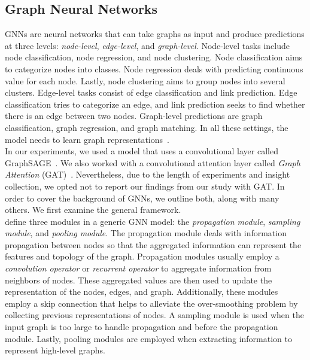 \subsection{Graph Neural Networks}
\label{subsec:mixedApproaches_GraphNeuralNetworks}
GNNs are neural networks that can take graphs as input and produce predictions at three levels:
\emph{node-level}, \emph{edge-level}, and \emph{graph-level}. Node-level tasks include node classification, node
regression, and node clustering. Node classification aims to categorize nodes into classes. Node regression deals with
predicting continuous value for each node. Lastly, node clustering aims to group nodes into several clusters. Edge-level tasks consist of edge classification and link prediction. Edge classification tries to categorize an edge, and link prediction seeks to find whether there is an edge between two nodes. Graph-level predictions are graph classification, graph regression, and graph matching. In all these settings, the model needs to learn graph representations~\parencite{GNNsAReview_Zhou}.\\
In our experiments, we used a model that uses a convolutional layer called GraphSAGE~\parencite{GraphSAGE_Hamilton}. We also worked with a convolutional attention layer called \emph{Graph Attention} (GAT)~\parencite{GraphAttentionNetworks_Velickovic}. Nevertheless, due to the length of experiments and insight collection, we opted not to report our findings from our study with GAT. In order to cover the background of GNNs, we outline both, along with many others. We first examine the general framework.\\
\cite{GNNsAReview_Zhou} define three modules in a generic GNN model: the \emph{propagation module}, \emph{sampling module}, and \emph{pooling module}. The propagation module deals with information propagation between nodes so that the aggregated information can represent the features and topology of the graph. Propagation modules usually employ a \emph{convolution operator} or \emph{recurrent operator} to aggregate information from neighbors of nodes. These aggregated values are then used to update the representation of the nodes, edges, and graph. Additionally, these modules employ a skip connection that helps to alleviate the over-smoothing problem by collecting previous representations of nodes. A sampling module is used when the input graph is too large to handle propagation and before the propagation module. Lastly, pooling modules are employed when extracting information to represent high-level graphs.\\
